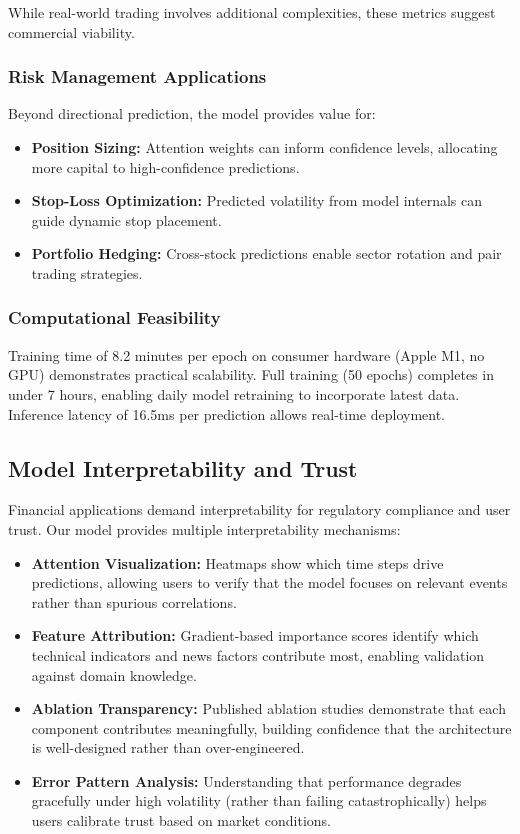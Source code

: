 \documentclass[conference]{IEEEtran}
\begin{document}
While real-world trading involves additional complexities, these metrics suggest commercial viability.

\subsubsection{Risk Management Applications}
Beyond directional prediction, the model provides value for:

\begin{itemize}
\item \textbf{Position Sizing:} Attention weights can inform confidence levels, allocating more capital to high-confidence predictions.
\item \textbf{Stop-Loss Optimization:} Predicted volatility from model internals can guide dynamic stop placement.
\item \textbf{Portfolio Hedging:} Cross-stock predictions enable sector rotation and pair trading strategies.
\end{itemize}

\subsubsection{Computational Feasibility}
Training time of 8.2 minutes per epoch on consumer hardware (Apple M1, no GPU) demonstrates practical scalability. Full training (50 epochs) completes in under 7 hours, enabling daily model retraining to incorporate latest data. Inference latency of 16.5ms per prediction allows real-time deployment.

\subsection{Model Interpretability and Trust}

Financial applications demand interpretability for regulatory compliance and user trust. Our model provides multiple interpretability mechanisms:

\begin{itemize}
\item \textbf{Attention Visualization:} Heatmaps show which time steps drive predictions, allowing users to verify that the model focuses on relevant events rather than spurious correlations.

\item \textbf{Feature Attribution:} Gradient-based importance scores identify which technical indicators and news factors contribute most, enabling validation against domain knowledge.

\item \textbf{Ablation Transparency:} Published ablation studies demonstrate that each component contributes meaningfully, building confidence that the architecture is well-designed rather than over-engineered.

\item \textbf{Error Pattern Analysis:} Understanding that performance degrades gracefully under high volatility (rather than failing catastrophically) helps users calibrate trust based on market conditions.
\end{itemize}
\end{document}
